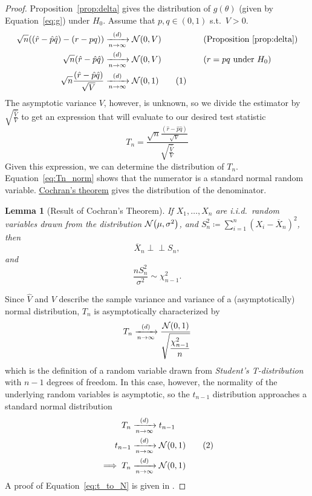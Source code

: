 \documentclass[letterpaper, oneside, reqno]{amsart}
\newtheorem{lemma}[theorem]{Lemma}
\numberwithin{equation}{section}
\newcommand{\numberthis}{\addtocounter{equation}{1}\tag{\theequation}}
\newcommand{\ddfrac}[2]{\frac{\displaystyle #1}{\displaystyle #2}}
\newcommand{\N}[2]{\mathcal{N}\mleft( #1, #2 \mright)}
\newcommand{\indep}{\perp \!\!\! \perp}  %
\newcommand{\iid}{i.i.d.}
\newcommand{\sumi}[2]{\sum_{#1=1}^{#2}}
\newcommand{\by}[1]{&\quad&\text{(#1)}}
\newcommand{\Dlim}{\xrightarrow[n \to \infty]{(d)}}
\newcommand{\phat}{\hat{p}}
\newcommand{\qhat}{\hat{q}}
\newcommand{\rhat}{\hat{r}}
\newcommand{\Xnbar}{\overline{X}_n}
\begin{document}
\begin{proof}
  Proposition~\ref{prop:delta} gives the distribution of $g(\theta)$ (given by
  Equation~\eqref{eq:g}) under $H_0$. 
  Assume that $p, q \in (0, 1)$ s.t.\ $V > 0$.
  \begin{alignat*}{3}
  \sqrt{n}\mleft((\rhat - \phat\qhat) - (r - pq)\mright) &\Dlim \N{0}{V}
  \by{Proposition~\ref{prop:delta}} \\
  \sqrt{n}(\rhat - \phat\qhat) &\Dlim \N{0}{V} \by{$r = pq$ under $H_0$} \\
  \sqrt{n}\frac{(\rhat - \phat\qhat)}{\sqrt{V}} &\Dlim \N{0}{1} \numberthis
  \label{eq:Tn_norm}
\end{alignat*}
The asymptotic variance $V$, however, is unknown, so we divide the estimator by
$\sqrt{\frac{\hat{V}}{V}}$ to get an expression that will evaluate to our
desired test statistic
\begin{equation} \label{eq:t1}
  T_n = \ddfrac{\sqrt{n}\frac{(\rhat - \phat\qhat)}{\sqrt{V}}}
               {\sqrt{\frac{\hat{V}}{V}}} 
\end{equation}
Given this expression, we can determine the distribution of $T_n$.
Equation~\eqref{eq:Tn_norm} shows that the numerator is a standard normal random
variable. 
\href{https://en.wikipedia.org/wiki/Cochran's_theorem}{\underline{Cochran's theorem}}
gives the distribution of the denominator.
\begin{lemma}[Result of Cochran's Theorem]
  If $X_1, \dots, X_n$ are \iid\ random variables drawn from the distribution
  $\N{\mu}{\sigma^2}$, and $S_n^2 \coloneqq \sumi{i}{n} (X_i - \Xnbar)^2$,
  then
  \[ \Xnbar \indep S_n, \]
  and
  \[ \frac{n S_n^2}{\sigma^2} \sim \chi^2_{n-1}. \]
\end{lemma}
Since $\hat{V}$ and $V$ describe the sample variance and variance of a
(asymptotically) normal distribution, $T_n$ is asymptotically characterized by
\begin{equation}
  T_n \Dlim \ddfrac{\N{0}{1}}{\sqrt{\frac{\chi^2_{n-1}}{n}}}
\end{equation}
which is the definition of a random variable drawn from \emph{Student's
T-distribution} with $n-1$ degrees of freedom. In this case, however, the
normality of the underlying random variables is asymptotic, so the $t_{n-1}$
distribution approaches a standard normal distribution
\begin{align*}
  T_n &\Dlim t_{n-1} \\
  t_{n-1} &\Dlim \N{0}{1} \numberthis \label{eq:t_to_N} \\
  \implies T_n &\Dlim \N{0}{1} \qedhere
\end{align*}
A proof of Equation~\eqref{eq:t_to_N} is given in .
\end{proof}
\end{document}
